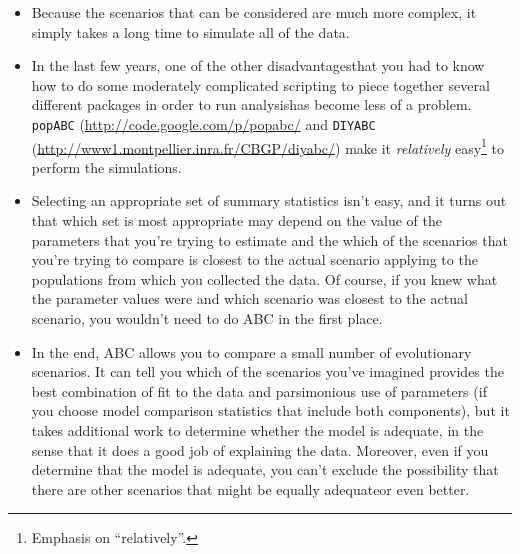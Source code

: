 \documentclass[12pt]{article}
\begin{document}
\begin{itemize}

\item Because the scenarios that can be considered are much more
  complex, it simply takes a long time to simulate all of the data. 

\item In the last few years, one of the other disadvantages{\dash}that
  you had to know how to do some moderately complicated scripting to
  piece together several different packages in order to run
  analysis{\dash}has become less of a problem. {\tt popABC}
  (\url{http://code.google.com/p/popabc/} and {\tt DIYABC}
  (\url{http://www1.montpellier.inra.fr/CBGP/diyabc/}) make it {\it
    relatively\/} easy\footnote{Emphasis on ``relatively''.} to
  perform the simulations.

\item Selecting an appropriate set of summary statistics isn't easy,
  and it turns out that which set is most appropriate may depend on
  the value of the parameters that you're trying to estimate and the
  which of the scenarios that you're trying to compare is closest to
  the actual scenario applying to the populations from which you
  collected the data. Of course, if you knew what the parameter values
  were and which scenario was closest to the actual scenario, you
  wouldn't need to do ABC in the first place.

\item In the end, ABC allows you to compare a small number of
  evolutionary scenarios. It can tell you which of the scenarios
  you've imagined provides the best combination of fit to the data and
  parsimonious use of parameters (if you choose model comparison
  statistics that include both components), but it takes additional
  work to determine whether the model is adequate, in the sense that
  it does a good job of explaining the data. Moreover, even if you
  determine that the model is adequate, you can't exclude the
  possibility that there are other scenarios that might be equally
  adequate{\dash}or even better.

\end{itemize}




\ccLicense
\end{document}
